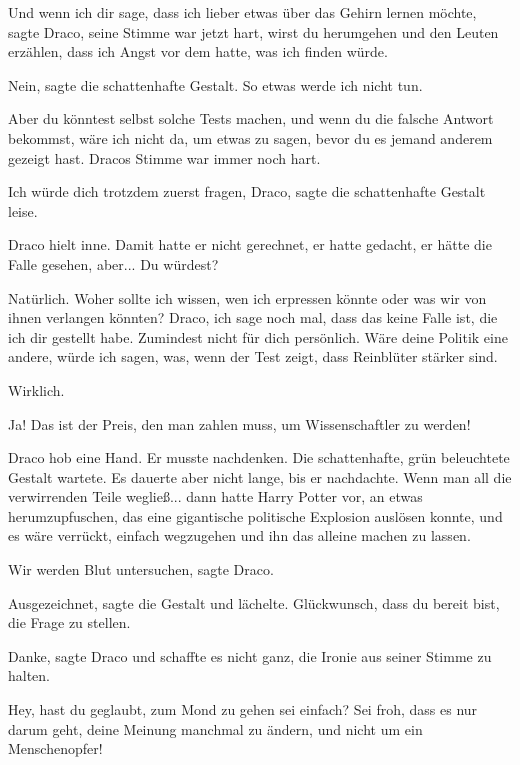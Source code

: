 \glqq{}Und wenn ich dir sage, dass ich lieber etwas über das Gehirn lernen
möchte\grqq{}, sagte Draco, seine Stimme war jetzt hart, \glqq{}wirst du
herumgehen und den Leuten erzählen, dass ich Angst vor dem hatte, was ich finden
würde.\grqq{}

\glqq{}Nein\grqq{}, sagte die schattenhafte Gestalt. \glqq{}So etwas werde ich
nicht tun.\grqq{}

\glqq{}Aber du könntest selbst solche Tests machen, und wenn du die falsche
Antwort bekommst, wäre ich nicht da, um etwas zu sagen, bevor du es jemand
anderem gezeigt hast.\grqq{} Dracos Stimme war immer noch hart.

\glqq{}Ich würde dich trotzdem zuerst fragen, Draco\grqq{}, sagte die
schattenhafte Gestalt leise.

Draco hielt inne. Damit hatte er nicht gerechnet, er hatte gedacht, er hätte die
Falle gesehen, aber... \glqq{}Du würdest?\grqq{}

\glqq{}Natürlich. Woher sollte ich wissen, wen ich erpressen könnte oder was wir
von ihnen verlangen könnten? Draco, ich sage noch mal, dass das keine Falle ist,
die ich dir gestellt habe. Zumindest nicht für dich persönlich. Wäre deine
Politik eine andere, würde ich sagen, was, wenn der Test zeigt, dass Reinblüter
stärker sind.\grqq{}

\glqq{}Wirklich.\grqq{}

\glqq{}Ja! Das ist der Preis, den man zahlen muss, um Wissenschaftler zu
werden!\grqq{}

Draco hob eine Hand. Er musste nachdenken. Die schattenhafte, grün beleuchtete
Gestalt wartete. Es dauerte aber nicht lange, bis er nachdachte. Wenn man all
die verwirrenden Teile wegließ... dann hatte Harry Potter vor, an etwas
herumzupfuschen, das eine gigantische politische Explosion auslösen konnte, und
es wäre verrückt, einfach wegzugehen und ihn das alleine machen zu lassen.

\glqq{}Wir werden Blut untersuchen\grqq{}, sagte Draco.

\glqq{}Ausgezeichnet\grqq{}, sagte die Gestalt und lächelte. \glqq{}Glückwunsch,
dass du bereit bist, die Frage zu stellen.\grqq{}

\glqq{}Danke\grqq{}, sagte Draco und schaffte es nicht ganz, die Ironie aus
seiner Stimme zu halten.

\glqq{}Hey, hast du geglaubt, zum Mond zu gehen sei einfach? Sei froh, dass es
nur darum geht, deine Meinung manchmal zu ändern, und nicht um ein
Menschenopfer!\grqq{}

